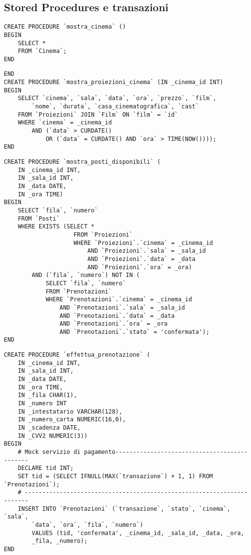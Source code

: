 \pagebreak
\subsection*{Stored Procedures e transazioni}
%
%

\begin{verbatim}
CREATE PROCEDURE `mostra_cinema` ()
BEGIN
    SELECT *
    FROM `Cinema`;
END
\end{verbatim}

\begin{verbatim}
END
CREATE PROCEDURE `mostra_proiezioni_cinema` (IN _cinema_id INT)
BEGIN
    SELECT `cinema`, `sala`, `data`, `ora`, `prezzo`, `film`,
        `nome`, `durata`, `casa_cinematografica`, `cast`
    FROM `Proiezioni` JOIN `Film` ON `film` = `id`
    WHERE `cinema` = _cinema_id
        AND (`data` > CURDATE()
            OR (`data` = CURDATE() AND `ora` > TIME(NOW())));
END
\end{verbatim}

\begin{verbatim}
CREATE PROCEDURE `mostra_posti_disponibili` (
    IN _cinema_id INT,
    IN _sala_id INT,
    IN _data DATE,
    IN _ora TIME)
BEGIN
    SELECT `fila`, `numero`
    FROM `Posti`
    WHERE EXISTS (SELECT *
                    FROM `Proiezioni`
                    WHERE `Proiezioni`.`cinema` = _cinema_id
                        AND `Proiezioni`.`sala` = _sala_id
                        AND `Proiezioni`.`data` = _data
                        AND `Proiezioni`.`ora` = _ora) 
        AND (`fila`, `numero`) NOT IN (
            SELECT `fila`, `numero`
            FROM `Prenotazioni`
            WHERE `Prenotazioni`.`cinema` = _cinema_id
                AND `Prenotazioni`.`sala` = _sala_id
                AND `Prenotazioni`.`data` = _data
                AND `Prenotazioni`.`ora` = _ora
                AND `Prenotazioni`.`stato` = 'confermata');
END
\end{verbatim}

\pagebreak
\begin{verbatim}
CREATE PROCEDURE `effettua_prenotazione` (
    IN _cinema_id INT,
    IN _sala_id INT,
    IN _data DATE,
    IN _ora TIME,
    IN _fila CHAR(1),
    IN _numero INT
    IN _intestatario VARCHAR(128),
    IN _numero_carta NUMERIC(16,0),
    IN _scadenza DATE,
    IN _CVV2 NUMERIC(3))
BEGIN
    # Mock servizio di pagamento---------------------------------------------
    DECLARE tid INT;
    SET tid = (SELECT IFNULL(MAX(`transazione`) + 1, 1) FROM `Prenotazioni`);
    # -----------------------------------------------------------------------
    INSERT INTO `Prenotazioni` (`transazione`, `stato`, `cinema`, `sala`,
        `data`, `ora`, `fila`, `numero`)
        VALUES (tid, 'confermata', _cinema_id, _sala_id, _data, _ora,
        _fila, _numero);
END
\end{verbatim}

